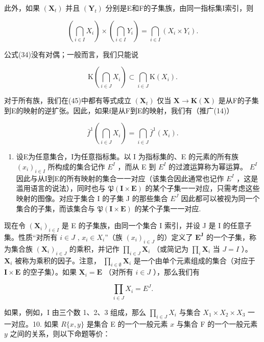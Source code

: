 此外，如果 \((\mathbf{X}_{t})\) 并且 \((\mathbf{Y}_{t})\) 分别是E和F的子集族，由同一指标集I索引，则

\[
\left(\bigcap_ {i \in I} X _ {i}\right) \times \left(\bigcap_ {i \in I} Y _ {i}\right) = \bigcap_ {i \in I} (X _ {i} \times Y _ {i}).\tag{44}
\]

公式(34)没有对偶；一般而言，我们只能说

\[
\mathrm{K} \left(\bigcap_ {i \in J} X _ {i}\right) \subset \bigcap_ {i \in J} \mathrm{K} (X _ {i}).\tag{45}
\]

对于所有族，我们在(45)中都有等式成立 \((\mathbf{X}_{t})\) 仅当 \(\mathbf{X} \to \mathbf{K}(\mathbf{X})\) 是从F的子集到E的映射的逆扩张。因此，如果f是从F到E的映射，我们有（推广(14)）

\[
\bar {f} ^ {1} \left(\bigcap_ {i \in J} X _ {i}\right) = \bigcap_ {i \in J} \bar {f} ^ {1} (X _ {i}).\tag{46}
\]

\begin{enumerate}
\def\labelenumi{\arabic{enumi}.}
\setcounter{enumi}{8}
\tightlist
\item
  设E为任意集合，I为任意指标集。以 I 为指标集的、E 的元素的所有族 \((x_{i})_{i\in I}\) 所构成的集合记作 \(E^{I}\) ，而从 E 到 \(E^{I}\) 的过渡运算称为幂运算。 \(E^{I}\) 因此与从I到E的所有映射的集合一一对应（该集合因此通常也记作 \(E^{I}\) ，这是滥用语言的说法），同时也与 \(\mathfrak{P}(\mathbf{I} \times \mathbf{E})\) 的某个子集一一对应，只需考虑这些映射的图像。对应于集合 I 的子集 J 的那些集合 \(E^{J}\) 因此都可以被视为同一个集合的子集，而该集合与 \(\mathfrak{P}(\mathbf{I} \times \mathbf{E})\) 的某个子集一一对应.
\end{enumerate}

现在令 \((\mathbf{X}_i)_{i\in I}\) 是 E 的子集族，由同一个集合 I 索引，并设 J 是 I 的任意子集。性质“对所有 \(i\in J\) , \(x_i\in X_i\)''（族 \((x_i)_{i\in J}\) 的）定义了 \(\mathbf{E}^{\mathbf{J}}\) 的一个子集，称为集合族 \((\mathbf{X}_i)_{i\in J}\) 的乘积，并记作 \(\prod_{i\in J}\mathbf{X}_i\) （或简记为 \(\prod_{i}\mathbf{X}_i\) 当 \(J = I\) ）。 \(\mathbf{X}_i\) 被称为乘积的因子。注意， \(\prod_{i\in \emptyset}\mathbf{X}_i\) 是一个由单个元素组成的集合（对应于 \(\mathbf{I}\times \mathbf{E}\) 的空子集）。如果 \(\mathbf{X}_i = \mathbf{E}\) （对所有 \(i\in J\) ），那么我们有

\[
\prod_ {i \in J} X _ {i} = E ^ {J}.
\]

如果，例如，I 由三个数 1、2、3 组成，那么 \(\prod_{i\in J}X_i\) 与集合 \(X_1\times X_2\times X_3\) 一一对应。10. 如果 \(R\{x,y\}\) 是集合 E 的一个一般元素 \(x\) 与集合 F 的一个一般元素 \(y\) 之间的关系，则以下命题等价：


